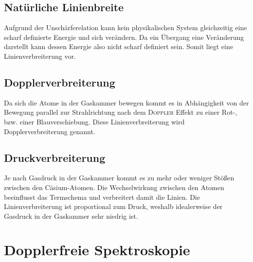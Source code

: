 \documentclass[../bericht.tex]{subfiles}
\begin{document}
      \subsection{Natürliche Linienbreite}
      \label{subsec:natuerliche-linienbreite}

        Aufgrund der Unschärferelation kann kein physikalischen System gleichzeitig eine scharf definierte Energie und sich verändern. Da ein Übergang eine Veränderung darstellt kann dessen Energie also nicht scharf definiert sein. Somit liegt eine Linienverbreiterung vor.


      \subsection{Dopplerverbreiterung}
      \label{subsec:dopplerverbreiterung}

        Da sich die Atome in der Gaskammer bewegen kommt es in Abhängigkeit von der Bewegung parallel zur Strahlrichtung nach dem \textsc{Doppler} Effekt zu einer Rot-, bzw. einer Blauverschiebung. Diese Linienverbreiterung wird Dopplerverbreiterung genannt.


      \subsection{Druckverbreiterung}
      \label{subsec:druckverbreiterung}

        Je nach Gasdruck in der Gaskammer kommt es zu mehr oder weniger Stö{\ss}en zwischen den Cäsium-Atomen. Die Wechselwirkung zwischen den Atomen beeinflusst das Termschema und verbreitert damit die Linien. Die Linienverbreiterung ist proportional zum Druck, weshalb idealerweise der Gasdruck in der Gaskammer sehr niedrig ist.


    \section{Dopplerfreie Spektroskopie}
\end{document}
